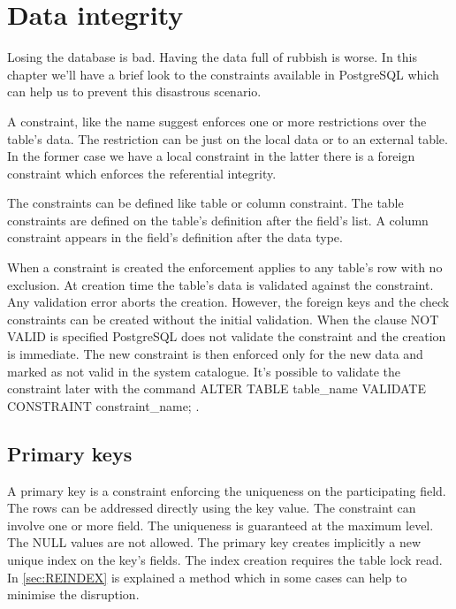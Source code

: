 \chapter{Data integrity}
\label{cha:DATAINT}
Losing the database is bad. Having the data full of rubbish is worse. In this chapter we'll have a
brief look to the constraints available in PostgreSQL which can help us to prevent this
disastrous scenario.\newline

A constraint, like the name suggest enforces one or more restrictions over the
table's data. The restriction can be just on the local data or to an external table. In the former
case we have a local constraint in the latter there is a foreign constraint which enforces the
referential integrity.\newline

The constraints can be defined like table or column constraint. The table constraints are defined on
the table's definition after the field's list. A column constraint appears in the field's
definition after the data type.\newline

When a constraint is created the enforcement applies to any table's row with no exclusion. At
creation time the table's data is validated against the constraint. Any validation error aborts
the creation. However, the foreign keys and the check constraints can be created without the initial
validation. When the clause NOT VALID is specified PostgreSQL does not
validate the constraint and the creation is immediate. The new constraint is then enforced only for
the new data and marked as not valid in the system catalogue. It's possible to validate the
constraint later with the command ALTER TABLE table\_name VALIDATE CONSTRAINT
constraint\_name; .

\section{Primary keys} 
A primary key is a constraint enforcing the uniqueness on the participating field. The rows
can be addressed directly using the key value. The constraint can involve one or more field. The
uniqueness is guaranteed at the maximum level. The NULL values are not allowed. The primary key
creates implicitly a new unique index on the key's fields. The index creation requires the table
lock read. In \ref{sec:REINDEX} is explained a method which in some cases can help to minimise the
disruption.\newline

